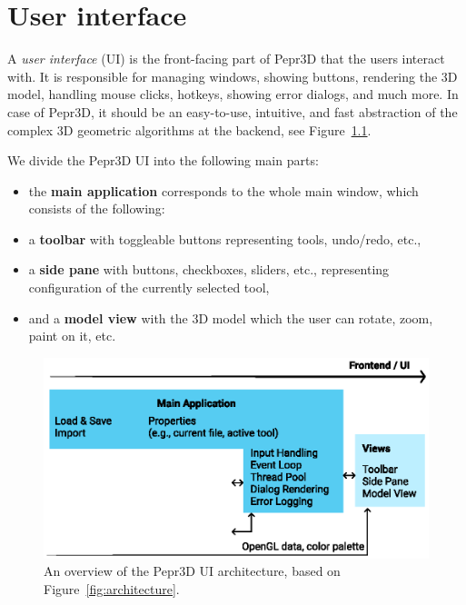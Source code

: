 \chapter{User interface}
\label{ch:ui}

A \emph{user interface} (UI) is the front-facing part of Pepr3D that the users interact with.
It is responsible for managing windows, showing buttons, rendering the 3D model, handling mouse clicks, hotkeys, showing error dialogs, and much more.
In case of Pepr3D, it should be an easy-to-use, intuitive, and fast abstraction of the complex 3D geometric algorithms at the backend, see Figure~\ref{fig:diagram_ui}.

\medskip

We divide the Pepr3D UI into the following main parts:
%
\begin{itemize}
\setlength\itemsep{0em}
\item the \textbf{main application} corresponds to the whole main window, which consists of the following:
\item a \textbf{toolbar} with toggleable buttons representing tools, undo/redo, etc.,
\item a \textbf{side pane} with buttons, checkboxes, sliders, etc., representing configuration of the currently selected tool,
\item and a \textbf{model view} with the 3D model which the user can rotate, zoom, paint on it, etc.
\end{itemize}

\begin{figure}[h]
	\centering
	\centerline{\includegraphics[scale=1.0]{images/diagram_ui.eps}}
	\caption{An overview of the Pepr3D UI architecture, based on Figure~\ref{fig:architecture}.}
	\label{fig:diagram_ui}
\end{figure}
\vspace{-1.5em}

